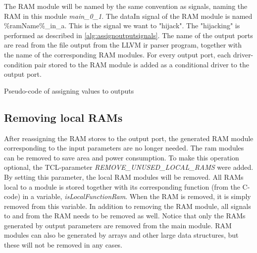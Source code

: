 The RAM module will be named by the same convention as signals, naming the RAM in this module \textit{main\_0\_1}. The dataIn signal of the RAM module is named \%ramName\%\_in\_a. This is the signal we want to "hijack". The "hijacking" is performed as described in \cref{alg:assignoutputsignals}. The name of the output ports are read from the file output from the LLVM \gls{ir} parser program, together with the name of the corresponding RAM modules. For every output port, each driver-condition pair stored to the RAM module is added as a conditional driver to the output port.
\makeatletter
\let\OldStatex\Statex
\renewcommand{\Statex}[1][3]{%
  \setlength\@tempdima{\algorithmicindent}%
  \OldStatex\hskip\dimexpr#1\@tempdima\relax}
\makeatother
\begin{algorithm}
  \caption{Pseudo-code of assigning values to outputs
  \label{alg:assignoutputsignals}}
\end{algorithm}

\subsection{Removing local RAMs}
After reassigning the RAM stores to the output port, the generated RAM module corresponding to the input parameters are no longer needed. The ram modules can be removed to save area and power consumption. To make this operation optional, the TCL-parameter \textit{REMOVE\_UNUSED\_LOCAL\_RAMS} were added. By setting this parameter, the local RAM modules will be removed. All RAMs local to a module is stored together with its corresponding function (from the C-code) in a variable, \textit{isLocalFunctionRam}. When the RAM is removed, it is simply removed from this variable. In addition to removing the RAM module, all signals to and from the RAM needs to be removed as well. Notice that only the RAMs generated by output parameters are removed from the main module. RAM modules can also be generated by arrays and other large data structures, but these will not be removed in any cases.

